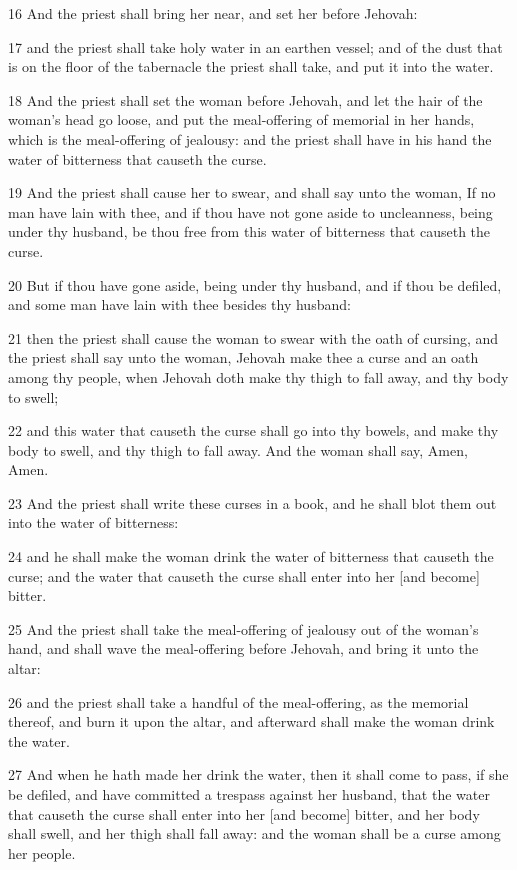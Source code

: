 \par 16 And the priest shall bring her near, and set her before Jehovah:
\par 17 and the priest shall take holy water in an earthen vessel; and of the dust that is on the floor of the tabernacle the priest shall take, and put it into the water.
\par 18 And the priest shall set the woman before Jehovah, and let the hair of the woman's head go loose, and put the meal-offering of memorial in her hands, which is the meal-offering of jealousy: and the priest shall have in his hand the water of bitterness that causeth the curse.
\par 19 And the priest shall cause her to swear, and shall say unto the woman, If no man have lain with thee, and if thou have not gone aside to uncleanness, being under thy husband, be thou free from this water of bitterness that causeth the curse.
\par 20 But if thou have gone aside, being under thy husband, and if thou be defiled, and some man have lain with thee besides thy husband:
\par 21 then the priest shall cause the woman to swear with the oath of cursing, and the priest shall say unto the woman, Jehovah make thee a curse and an oath among thy people, when Jehovah doth make thy thigh to fall away, and thy body to swell;
\par 22 and this water that causeth the curse shall go into thy bowels, and make thy body to swell, and thy thigh to fall away. And the woman shall say, Amen, Amen.
\par 23 And the priest shall write these curses in a book, and he shall blot them out into the water of bitterness:
\par 24 and he shall make the woman drink the water of bitterness that causeth the curse; and the water that causeth the curse shall enter into her [and become] bitter.
\par 25 And the priest shall take the meal-offering of jealousy out of the woman's hand, and shall wave the meal-offering before Jehovah, and bring it unto the altar:
\par 26 and the priest shall take a handful of the meal-offering, as the memorial thereof, and burn it upon the altar, and afterward shall make the woman drink the water.
\par 27 And when he hath made her drink the water, then it shall come to pass, if she be defiled, and have committed a trespass against her husband, that the water that causeth the curse shall enter into her [and become] bitter, and her body shall swell, and her thigh shall fall away: and the woman shall be a curse among her people.
